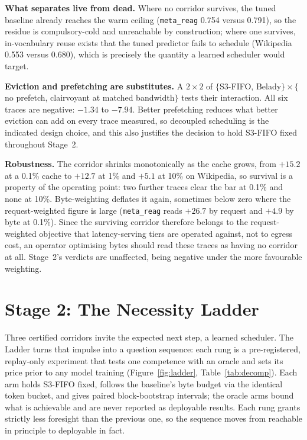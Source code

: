 \documentclass[letterpaper]{article} %
\begin{document}
\textbf{What separates live from dead.} Where no corridor survives, the tuned baseline already reaches the warm ceiling (\texttt{meta\_reag} 0.754 versus 0.791), so the residue is compulsory-cold and unreachable by construction; where one survives, in-vocabulary reuse exists that the tuned predictor fails to schedule (Wikipedia 0.553 versus 0.680), which is precisely the quantity a learned scheduler would target.

\textbf{Eviction and prefetching are substitutes.} A $2\times2$ of $\{$S3-FIFO, Belady$\}\times\{$no prefetch, clairvoyant at matched bandwidth$\}$ tests their interaction. All six traces are negative: $-1.34$ to $-7.94$. Better prefetching reduces what better eviction can add on every trace measured, so decoupled scheduling is the indicated design choice, and this also justifies the decision to hold S3-FIFO fixed throughout Stage~2.

\textbf{Robustness.} The corridor shrinks monotonically as the cache grows, from $+15.2$ at a 0.1\% cache to $+12.7$ at 1\% and $+5.1$ at 10\% on Wikipedia, so survival is a property of the operating point: two further traces clear the bar at 0.1\% and none at 10\%. Byte-weighting deflates it again, sometimes below zero where the request-weighted figure is large (\texttt{meta\_reag} reads $+26.7$ by request and $+4.9$ by byte at 0.1\%). Since the surviving corridor therefore belongs to the request-weighted objective that latency-serving tiers are operated against, not to egress cost, an operator optimising bytes should read these traces as having no corridor at all. Stage~2's verdicts are unaffected, being negative under the more favourable weighting.


\section{Stage 2: The Necessity Ladder}
Three certified corridors invite the expected next step, a learned scheduler. The Ladder turns that impulse into a question sequence: each rung is a pre-registered, replay-only experiment that tests one competence with an oracle and sets its price prior to any model training (Figure~\ref{fig:ladder}, Table~\ref{tab:decomp}). Each arm holds S3-FIFO fixed, follows the baseline's byte budget via the identical token bucket, and gives paired block-bootstrap intervals; the oracle arms bound what is achievable and are never reported as deployable results. Each rung grants strictly less foresight than the previous one, so the sequence moves from reachable in principle to deployable in fact.
\end{document}
